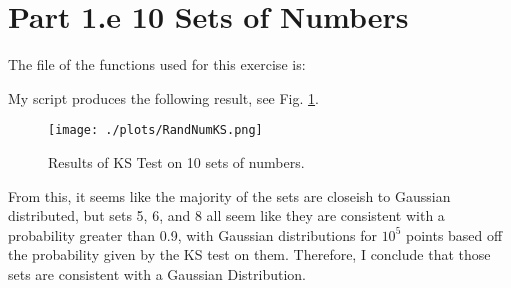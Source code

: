\section{Part 1.e 10 Sets of Numbers}

The file of the functions used for this exercise is:



My script produces the following result, see Fig. \ref{fig:10_sets}.

\begin{figure}[h!]
  \centering
  \texttt{[image: ./plots/RandNumKS.png]}
  \caption{Results of KS Test on 10 sets of numbers.}
  \label{fig:10_sets}
\end{figure}

From this, it seems like the majority of the sets are closeish to Gaussian distributed, but sets 5, 6, and 8 all seem like
they are consistent with a probability greater than 0.9, with Gaussian distributions for $10^5$ points based off the probability given by the KS test on them.
Therefore, I conclude that those sets are consistent with a Gaussian Distribution.

